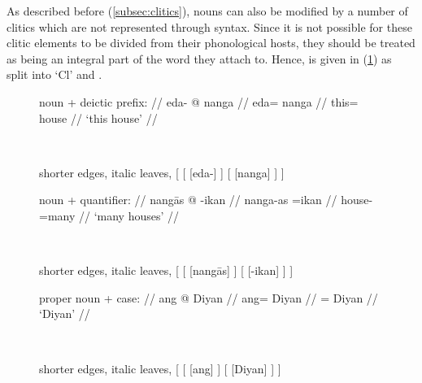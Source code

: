 As described before (\autoref{subsec:clitics}), nouns can also be modified
by a number of clitics which are not represented through syntax. Since it is
not possible for these clitic elements to be divided from their phonological
hosts, they should be treated as being an integral part of the word they attach
to. Hence,  is given in (\ref{ex:nouncltree}) as split into `Cl' and
.

\begin{figure}
\pex\label{ex:nouncltree}
\a %
	\begin{minipage}[t]{.5\remaining}
	\begingl
		\glpreamble noun + deictic prefix: //
		\gla eda- @ nanga //
		\glb eda= nanga //
		\glc this= house //
		\glft `this house' //
	\endgl
	\end{minipage}
	~
	\begin{forest} shorter edges, italic leaves,
	[
		[
			[eda-]
		]
		[
			[nanga]
		]
	]
	\end{forest}

\a %
	\begin{minipage}[t]{.5\remaining}
	\begingl
		\glpreamble noun + quantifier: //
		\gla nangās @ -ikan //
		\glb nanga-as =ikan //
		\glc house-\Parg{} =many //
		\glft `many houses' //
	\endgl
	\end{minipage}
	~
	\begin{forest} shorter edges, italic leaves,
	[
		[
			[nangās]
		]
		[
			[-ikan]
		]
	]
	\end{forest}

\a %
	\begin{minipage}[t]{.5\remaining}
	\begingl
		\glpreamble proper noun + case: //
		\gla ang @ Diyan //
		\glb ang= Diyan //
		\glc \Aarg{}= Diyan //
		\glft `Diyan' //
	\endgl
	\end{minipage}
	~
	\begin{forest} shorter edges, italic leaves,
	[
		[
			[ang]
		]
		[
			[Diyan]
		]
	]
	\end{forest}

\xe
\end{figure}


